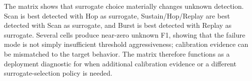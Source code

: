 The matrix shows that surrogate choice materially changes unknown detection. Scan is best detected with Hop as surrogate, Sustain/Hop/Replay are best detected with Scan as surrogate, and Burst is best detected with Replay as surrogate. Several cells produce near-zero unknown F1, showing that the failure mode is not simply insufficient threshold aggressiveness; calibration evidence can be mismatched to the target behavior. The matrix therefore functions as a deployment diagnostic for when additional calibration evidence or a different surrogate-selection policy is needed.
